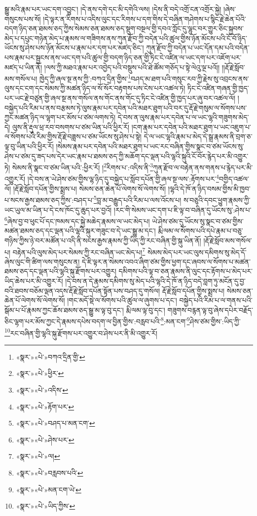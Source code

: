 སྒྱུ་མའི་རྣམ་པར་ཡང་དག་འབྱུང་། །དེ་ནས་དགེ་དང་མི་དགེའི་ལས། །དེས་ནི་བདེ་འགྲོ་ངན་འགྲོར་སྐྱེ། །ཞེས་གསུངས་པས་སོ། །དེ་ལྟར་ན་རིགས་པ་འདིས་ལུང་དང་རིགས་པ་དག་གིས་དེ་བཞིན་གཤེགས་པ་སྙིང་རྗེ་ཆེན་པོའི་བདག་ཉིད་ཅན་ཐམས་ཅད་ཀྱིས་སེམས་ཅན་ཐམས་ཅད་སྡུག་བསྔལ་གྱི་དབའ་ཀློང་དུ་ལྷུང་བར་གྱུར་ཅིང་སྐྱབས་མེད་པ་དཔུང་གཉེན་མེད་པ་རྣམས་ལ་གཟིགས་ནས་ཀུན་རྫོབ་ཀྱི་བདེན་པའི་ཚུལ་གྱིས་ཉོན་མོངས་པའི་ངོ་བོ་ཉིད་ཡོངས་སུ་ཤེས་པས་ཉོན་མོངས་པ་རྣམ་པར་དག་པར་མཛད་ཅིང་། ཀུན་རྫོབ་ཀྱི་བདེན་པ་ཡང་དོན་དམ་པའི་བདེན་པས་རྣམ་པར་སྦྱངས་ནས་ཡང་དག་པའི་ཚུལ་གྱི་བདག་ཉིད་ཅན་གྱི་ཏིང་ངེ་འཛིན་ལ་ཡང་དག་པར་འཇོག་པར་མཛད་པ་ཡིན་ནོ། །ལས་ཀྱི་མཐའ་རྣམ་པར་འབྱེད་པའི་བསྡུས་པའི་ཐེ་ཚོམ་གཅོད་པ་སྟེ་ལེའུ་ལྔ་པའོ།། །།རྡོ་རྗེ་སློབ་མས་གསོལ་པ། ཁྱེད་ཀྱི་ཞལ་སྔ་ནས་ཀྱི་:བཀའ་དྲིན་གྱིས་\footnote{«སྣར་»«པེ་»བཀའ་དྲིན་གྱི་}བཤད་མ་ཐག་པའི་གསུང་རབ་ཀྱི་རྗེས་སུ་འབྲངས་ནས་ལུས་དང་ངག་དང་སེམས་ཀྱི་མཚན་ཉིད་ལ་སོ་སོར་བརྟགས་པས་ངེས་པར་འཚལ་ཏེ། ཏིང་ངེ་འཛིན་གཞན་གྱི་ཁྱད་པར་ཡང་རྗེ་བཙུན་གྱི་ཞལ་སྔ་ནས་གསོལ་ནས་གོང་ནས་གོང་དུ་ཏིང་ངེ་འཛིན་གྱི་ཁྱད་པར་ཞུ་བར་འཚལ་ལོ། །བསྐྱེད་པའི་རིམ་པ་ནས་བརྩམས་ཏེ་ལུས་རྣམ་པར་དབེན་པའི་མཐར་ཐུག་པའི་བར་དུ་རྡོ་རྗེ་གསུམ་ལ་སོགས་པས་ཀྱང་མཚན་ཉིད་ལ་ལྷག་པར་མོས་པ་ཙམ་ལགས་ཏེ། དེ་བས་ན་ལུས་རྣམ་པར་དབེན་པ་ལ་ཡང་ལྷའི་གཟུགས་མེད་དེ། ལུས་ནི་རྡུལ་ཕྲ་རབ་བསགས་པ་ཙམ་ཡིན་པའི་ཕྱིར་རོ། །ངག་རྣམ་པར་དབེན་པའི་མཐར་ཐུག་པ་ཡང་འཇུག་པ་ལ་སོགས་པའི་རིམ་གྱིས་རྡོ་རྗེ་བཟླས་པ་ཙམ་ཡོངས་སུ་ཤེས་པ་སྟེ། དེ་ལ་ཡང་ལྷའི་རྣམ་པ་མེད་དེ་སྒྲ་རྣམས་ནི་བྲག་ཅ་ལྟ་བུ་ཡིན་པའི་ཕྱིར་རོ། །སེམས་རྣམ་པར་དབེན་པའི་མཐར་ཐུག་པ་ཡང་རང་བཞིན་གྱིས་སྣང་བ་ཙམ་ཡོངས་སུ་ཤེས་པ་ཙམ་དུ་ཟད་པས་དེར་ཡང་རྣམ་པ་ཐམས་ཅད་ཀྱི་མཆོག་དང་ལྡན་པའི་ལྷའི་སྐུའི་ངོ་བོར་རྙེད་པར་མི་འགྱུར་ཏེ། སེམས་ནི་སྣང་བ་ཙམ་ཡིན་པའི་:ཕྱིར་རོ། །\footnote{«སྣར་»«པེ་»ཕྱིར་}རིགས་པ་:འདིས་ནི་\footnote{«སྣར་»«པེ་»འདིས་}ཀུན་རྫོབ་ལ་བརྟེན་ནས་གནས་པ་རྙེད་པར་མི་འགྱུར་རོ། །དེ་བས་ན་ཡེ་ཤེས་ཙམ་གྱིས་ལྷ་ཉིད་དུ་བསྐྱེད་པ་སློབ་དཔོན་གྱི་ཞལ་སྔ་ལས་:རྟོགས་པར་\footnote{«སྣར་»«པེ་»རྟོག་པར་}བགྱིད་འཚལ་ལོ། །རྡོ་རྗེ་སློབ་དཔོན་གྱིས་སྨྲས་པ། སེམས་ཅན་ཆེན་པོ་ལེགས་སོ་ལེགས་སོ། །ལྷའི་དེ་ཁོ་ན་ཉིད་བསམ་གྱིས་མི་ཁྱབ་པ་སངས་རྒྱས་ཐམས་ཅད་ཀྱིས་:བཤད་པ་\footnote{«སྣར་»«པེ་»བཤད་པ་མན་ངག་}བླ་མ་བརྒྱུད་པའི་རིམ་པ་ལས་འོངས་པ། ས་བཅུའི་དབང་ཕྱུག་རྣམས་ཀྱི་ཡང་ཡུལ་མ་ཡིན་པ་དེ་ངས་ཁོང་དུ་ཆུད་པར་བྱའོ། །རང་གི་སེམས་ཡང་དག་པ་ཇི་ལྟ་བ་བཞིན་དུ་ཡོངས་སུ་:ཤེས་པ་\footnote{«སྣར་»«པེ་»ཤེས་པར་}ཞེས་བྱ་བ་ཕུང་པོ་དང་ཁམས་དང་སྐྱེ་མཆེད་རྣམས་ལ་ཡང་མེད་པ། ཡེ་ཤེས་ཙམ་དུ་ཡོངས་སུ་སྣང་བ་ཙམ་གྱིས་མཚན་ཐམས་ཅད་དང་ལྡན་པའི་ལྷའི་སྐུར་གཟུང་བ་དེ་ཡང་སྒྱུ་མ་དང་། རྨི་ལམ་ལ་སོགས་པའི་དཔེ་རྣམ་པ་བཅུ་གཉིས་ཀྱིས་ཉེ་བར་མཚོན་པ་འདི་ནི་སངས་རྒྱས་རྣམས་ཀྱི་ཡིད་ཀྱི་རང་བཞིན་གྱི་སྐུ་ཡིན་ནོ། །རྡོ་རྗེ་སློབ་མས་གསོལ་པ། བརྟེན་པའི་ལུས་མེད་པར་སེམས་ཀྱི་རང་བཞིན་ཡང་མེད་པ།\footnote{«སྣར་»«པེ་»ལ།} སེམས་མེད་པར་ཡང་ལུས་དམིགས་སུ་མེད་དོ་ཞེས་ལུང་གི་ཚིག་ལས་གསུངས་ན། དེ་ཇི་ལྟར་ན་སེམས་འབའ་ཞིག་ཙམ་གྱིས་ཕྱག་དང་ཞབས་ལ་སོགས་པ་མཚན་ཐམས་ཅད་དང་ལྡན་པའི་ལྷའི་སྐུ་རྫོགས་པར་འགྱུར། དམིགས་པའི་ལྟ་བ་ཅན་རྣམས་ནི་ལུང་དང་རྟོགས་པ་མེད་པར་ཡིད་ཆེས་པར་མི་འགྱུར་རོ། །དེ་བས་ན་དེ་རྣམས་དམིགས་སུ་མེད་པའི་ལྷའི་དེ་ཁོ་ན་ཉིད་བདེ་བླག་ཏུ་མངོན་དུ་བྱ་བའི་ཐབས་བཅོམ་ལྡན་འདས་རྡོ་རྗེ་སློབ་དཔོན་སྟོན་པས་བཤད་དུ་གསོལ། རྡོ་རྗེ་སློབ་དཔོན་གྱིས་སྨྲས་པ། སེམས་ཅན་ཆེན་པོ་ལེགས་སོ་ལེགས་སོ། །གང་མདོ་སྡེ་ལ་སོགས་པའི་ཚུལ་ལ་ཞུགས་པ་དང་། བསྐྱེད་པའི་རིམ་པ་ལ་གནས་པའི་སྒོམ་པ་པོ་རྣམས་ཀྱང་ཆོས་ཐམས་ཅད་སྒྱུ་མ་ལྟ་བུ་དང་། རྨི་ལམ་ལྟ་བུ་དང་། གཟུགས་བརྙན་ལྟ་བུ་ཞེས་དཔེར་བརྗོད་ཅིང་ལྷག་པར་མོས་ཀྱང་དེ་རྣམས་དཔེས་བདག་ལ་བྱིན་གྱིས་:བརླབ་པའི་\footnote{«སྣར་»«པེ་»བརླབས་པའི་}:མན་ངག་\footnote{«སྣར་»«པེ་»མན་ངག་ཡེ་}ཤེས་ཙམ་གྱིས་:ཡིད་ཀྱི་\footnote{«སྣར་»«པེ་»ཡིད་ཀྱིས་}རང་བཞིན་གྱི་ལྷའི་སྐུ་རྫོགས་པར་འགྱུར་བ་ཤེས་པར་ནི་མི་འགྱུར་རོ། 